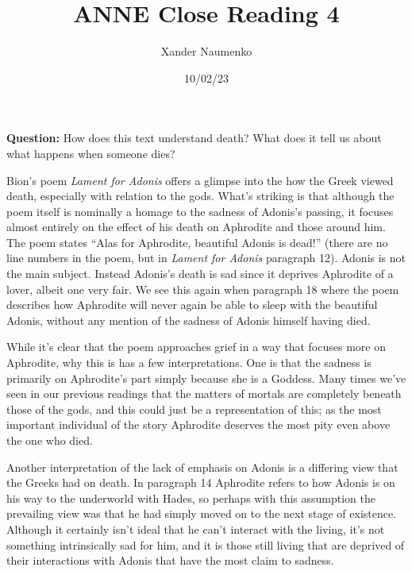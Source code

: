 \documentclass[letterpaper, reqno,11pt]{article}
\begin{document}
\title{ANNE Close Reading 4}
\date{10/02/23}
\author{Xander Naumenko}
\maketitle

{\bf Question:} How does this text understand death? What does it tell us about what happens when someone dies?

Bion's poem {\em Lament for Adonis} offers a glimpse into the how the Greek viewed death, especially with relation to the gods. What's striking is that although the poem itself is nominally a homage to the sadness of Adonis's passing, it focuses almost entirely on the effect of his death on Aphrodite and those around him. The poem states ``Alas for Aphrodite, beautiful Adonis is dead!'' (there are no line numbers in the poem, but in {\em Lament for Adonis} paragraph 12). Adonis is not the main subject. Instead Adonis's death is sad since it deprives Aphrodite of a lover, albeit one very fair. We see this again when paragraph 18 where the poem describes how Aphrodite will never again be able to sleep with the beautiful Adonis, without any mention of the sadness of Adonis himself having died. 

\medskip

While it's clear that the poem approaches grief in a way that focuses more on Aphrodite, why this is has a few interpretations. One is that the sadness is primarily on Aphrodite's part simply because she is a Goddess. Many times we've seen in our previous readings that the matters of mortals are completely beneath those of the gods, and this could just be a representation of this; as the most important individual of the story Aphrodite deserves the most pity even above the one who died. 

\medskip

Another interpretation of the lack of emphasis on Adonis is a differing view that the Greeks had on death. In paragraph 14 Aphrodite refers to how Adonis is on his way to the underworld with Hades, so perhaps with this assumption the prevailing view was that he had simply moved on to the next stage of existence. Although it certainly isn't ideal that he can't interact with the living, it's not something intrinsically sad for him, and it is those still living that are deprived of their interactions with Adonis that have the most claim to sadness. 
\end{document}
